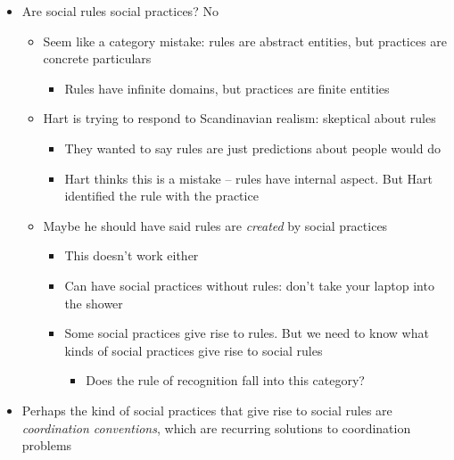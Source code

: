 \begin{itemize}
\tightlist
\item
  Are social rules social practices? No

  \begin{itemize}
  \tightlist
  \item
    Seem like a category mistake: rules are abstract entities, but
    practices are concrete particulars

    \begin{itemize}
    \tightlist
    \item
      Rules have infinite domains, but practices are finite entities
    \end{itemize}
  \item
    Hart is trying to respond to Scandinavian realism: skeptical about
    rules

    \begin{itemize}
    \tightlist
    \item
      They wanted to say rules are just predictions about people would
      do
    \item
      Hart thinks this is a mistake -- rules have internal aspect. But
      Hart identified the rule with the practice
    \end{itemize}
  \item
    Maybe he should have said rules are \emph{created} by social
    practices

    \begin{itemize}
    \tightlist
    \item
      This doesn't work either
    \item
      Can have social practices without rules: don't take your laptop
      into the shower
    \item
      Some social practices give rise to rules. But we need to know what
      kinds of social practices give rise to social rules

      \begin{itemize}
      \tightlist
      \item
        Does the rule of recognition fall into this category?
      \end{itemize}
    \end{itemize}
  \end{itemize}
\item
  Perhaps the kind of social practices that give rise to social rules
  are \emph{coordination conventions}, which are recurring solutions to
  coordination problems


\end{itemize}
